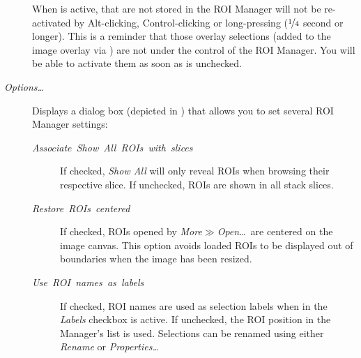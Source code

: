 \begin{description}
\begin{infobox}[h]
When  is active, 
that are not stored in the ROI Manager will not be re-activated by
Alt-clicking, Control-clicking or long-pressing ($\nicefrac{1}{4}$
second or longer). This is a reminder that those overlay selections
(added to the image overlay via )
are not under the control of the ROI Manager. You will be able to
activate them as soon as  is unchecked.
\end{infobox}

\item [{\emph{\label{misc:RM-Options...}Options\ldots{}}}] Displays a
dialog box (depicted in\emph{ }) that
allows you to set several ROI Manager settings:

\begin{description}
\item [{\emph{Associate\ \textquotedbl{}Show\ All\textquotedbl{}\ ROIs\ with\ slices}}] If
checked, \emph{Show All} will only reveal ROIs when browsing their
respective slice. If unchecked, ROIs are shown in all stack slices.
\item [{\emph{Restore\ ROIs\ centered}}] If checked, ROIs opened by \emph{More$\gg$Open}\ldots{}\ are
centered on the image canvas. This option avoids loaded ROIs to be
displayed out of boundaries when the image has been resized.
\item [{\emph{Use\ ROI\ names\ as\ labels}}] If checked, ROI names
are used as selection labels when in the \emph{Labels}
checkbox is active. If unchecked, the ROI position in the Manager's
list is used. Selections can be renamed using either \emph{Rename}
or \emph{Properties\ldots{}}
\end{description}
\end{description}




